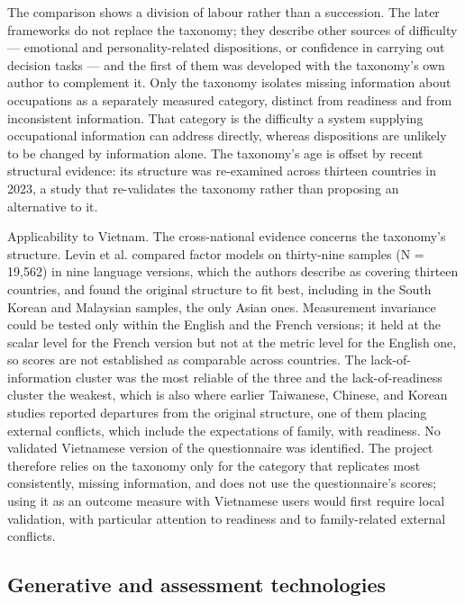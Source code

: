 The comparison shows a division of labour rather than a succession. The later frameworks do not replace the taxonomy; they describe other sources of difficulty --- emotional and personality-related dispositions\cite{r106,r107,r109}, or confidence in carrying out decision tasks\cite{r108} --- and the first of them was developed with the taxonomy's own author to complement it\cite{r106}. Only the taxonomy isolates missing information about occupations as a separately measured category, distinct from readiness and from inconsistent information. That category is the difficulty a system supplying occupational information can address directly, whereas dispositions are unlikely to be changed by information alone. The taxonomy's age is offset by recent structural evidence: its structure was re-examined across thirteen countries in 2023\cite{r2}, a study that re-validates the taxonomy rather than proposing an alternative to it.

Applicability to Vietnam. The cross-national evidence concerns the taxonomy's structure. Levin et al.\cite{r2} compared factor models on thirty-nine samples (N = 19,562) in nine language versions, which the authors describe as covering thirteen countries, and found the original structure to fit best, including in the South Korean and Malaysian samples, the only Asian ones. Measurement invariance could be tested only within the English and the French versions; it held at the scalar level for the French version but not at the metric level for the English one, so scores are not established as comparable across countries. The lack-of-information cluster was the most reliable of the three and the lack-of-readiness cluster the weakest, which is also where earlier Taiwanese, Chinese, and Korean studies reported departures from the original structure\cite{r111,r112,r113}, one of them placing external conflicts, which include the expectations of family, with readiness\cite{r111}. No validated Vietnamese version of the questionnaire was identified. The project therefore relies on the taxonomy only for the category that replicates most consistently, missing information, and does not use the questionnaire's scores; using it as an outcome measure with Vietnamese users would first require local validation, with particular attention to readiness and to family-related external conflicts.

\subsection{Generative and assessment technologies}

